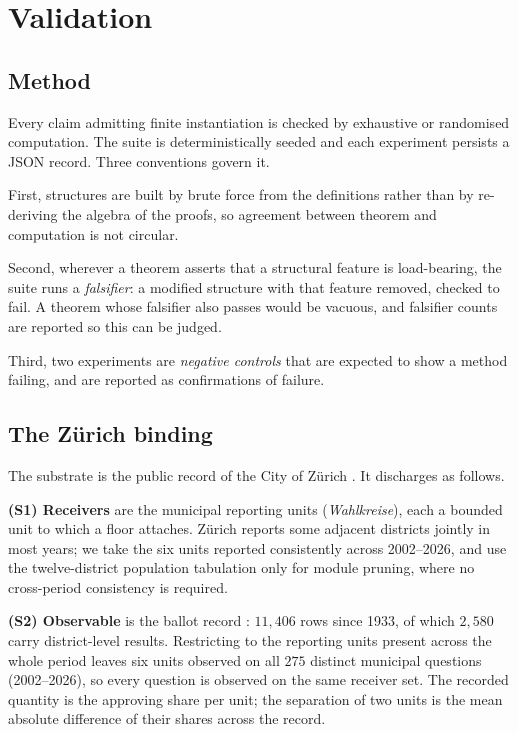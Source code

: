 \documentclass[11pt,a4paper]{article}
\theoremstyle{clstyle}
\theoremstyle{definition}
\theoremstyle{remark}
\begin{document}
\section{Validation}
\label{sec:validation}

\subsection{Method}

Every claim admitting finite instantiation is checked by exhaustive or
randomised computation. The suite is deterministically seeded and each
experiment persists a JSON record. Three conventions govern it.

First, structures are built by brute force from the definitions rather than
by re-deriving the algebra of the proofs, so agreement between theorem and
computation is not circular.

Second, wherever a theorem asserts that a structural feature is load-bearing,
the suite runs a \emph{falsifier}: a modified structure with that feature
removed, checked to fail. A theorem whose falsifier also passes would be
vacuous, and falsifier counts are reported so this can be judged.

Third, two experiments are \emph{negative controls} that are expected to show
a method failing, and are reported as confirmations of failure.

\subsection{The Z\"urich binding}
\label{sec:binding}

The substrate is the public record of the City of Z{\"u}rich
\citep{ogd_zurich_portal}. It discharges  as follows.

\textbf{(S1) Receivers} are the municipal reporting units
(\emph{Wahlkreise}), each a bounded unit to which a floor attaches. Z{\"u}rich
reports some adjacent districts jointly in most years; we take the six units
reported consistently across 2002--2026, and use the twelve-district
population tabulation only for module pruning, where no cross-period
consistency is required.

\textbf{(S2) Observable} is the ballot record
\citep{ssz_abstimmungen}: $11{,}406$ rows since 1933, of which $2{,}580$
carry district-level results. Restricting to the reporting units present
across the whole period leaves six units observed on all $275$ distinct
municipal questions (2002--2026), so every question is observed on the same
receiver set. The recorded quantity is the approving share per unit; the
separation of two units is the mean absolute difference of their shares
across the record.
\end{document}

